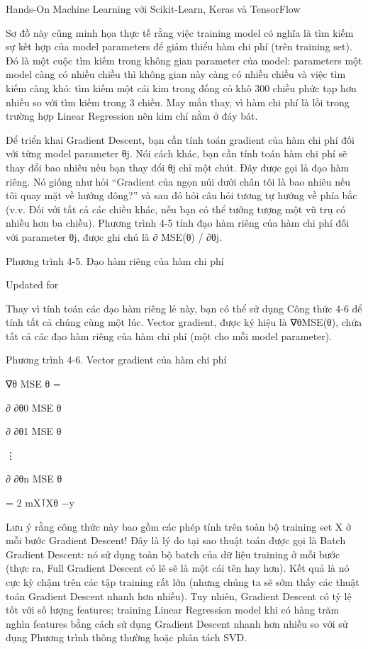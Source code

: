 Hands-On Machine Learning với Scikit-Learn, Keras và TensorFlow

Sơ đồ này cũng minh họa thực tế rằng việc training model có nghĩa là tìm kiếm sự kết hợp của model parameters để giảm thiểu hàm chi phí (trên training set). Đó là một cuộc tìm kiếm trong không gian parameter của model: parameters một model càng có nhiều chiều thì không gian này càng có nhiều chiều và việc tìm kiếm càng khó: tìm kiếm một cái kim trong đống cỏ khô 300 chiều phức tạp hơn nhiều so với tìm kiếm trong 3 chiều. May mắn thay, vì hàm chi phí là lồi trong trường hợp Linear Regression nên kim chỉ nằm ở đáy bát.

Để triển khai Gradient Descent, bạn cần tính toán gradient của hàm chi phí đối với từng model parameter θj. Nói cách khác, bạn cần tính toán hàm chi phí sẽ thay đổi bao nhiêu nếu bạn thay đổi θj chỉ một chút. Đây được gọi là đạo hàm riêng. Nó giống như hỏi “Gradient của ngọn núi dưới chân tôi là bao nhiêu nếu tôi quay mặt về hướng đông?” và sau đó hỏi câu hỏi tương tự hướng về phía bắc (v.v. Đối với tất cả các chiều khác, nếu bạn có thể tưởng tượng một vũ trụ có nhiều hơn ba chiều). Phương trình 4-5 tính đạo hàm riêng của hàm chi phí đối với parameter θj, được ghi chú là ∂ MSE(θ) / ∂θj.

Phương trình 4-5. Đạo hàm riêng của hàm chi phí

Updated for

Thay vì tính toán các đạo hàm riêng lẻ này, bạn có thể sử dụng Công thức 4-6 để tính tất cả chúng cùng một lúc. Vector gradient, được ký hiệu là ∇θMSE(θ), chứa tất cả các đạo hàm riêng của hàm chi phí (một cho mỗi model parameter).

Phương trình 4-6. Vector gradient của hàm chi phí

∇θ MSE θ =

∂ ∂θ0 MSE θ

∂ ∂θ1 MSE θ

⋮

∂ ∂θn MSE θ

= 2 mX⊺Xθ −y

Lưu ý rằng công thức này bao gồm các phép tính trên toàn bộ training set X ở mỗi bước Gradient Descent! Đây là lý do tại sao thuật toán được gọi là Batch Gradient Descent: nó sử dụng toàn bộ batch của dữ liệu training ở mỗi bước (thực ra, Full Gradient Descent có lẽ sẽ là một cái tên hay hơn). Kết quả là nó cực kỳ chậm trên các tập training rất lớn (nhưng chúng ta sẽ sớm thấy các thuật toán Gradient Descent nhanh hơn nhiều). Tuy nhiên, Gradient Descent có tỷ lệ tốt với số lượng features; training Linear Regression model khi có hàng trăm nghìn features bằng cách sử dụng Gradient Descent nhanh hơn nhiều so với sử dụng Phương trình thông thường hoặc phân tách SVD.

